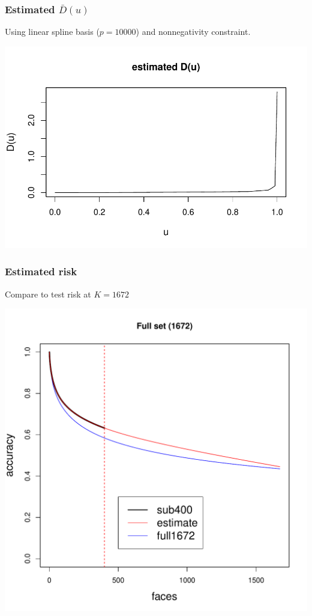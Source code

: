 \documentclass{beamer}
\begin{document}
\begin{frame}
\frametitle{Estimated $\bar{D}(u)$}
Using linear spline basis ($p=10000$) and nonnegativity constraint. 
\begin{center}
\includegraphics[scale = 0.5]{../facerec/du_est.pdf}
\end{center}
\end{frame}

\begin{frame}
\frametitle{Estimated risk}
Compare to test risk at $K = 1672$
\begin{center}
\includegraphics[scale = 0.4]{../facerec/acc_plot2.pdf}
\end{center}
\end{frame}
\end{document}
